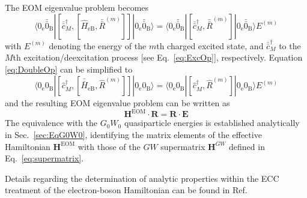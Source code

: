 The EOM eigenvalue problem becomes 
\begin{equation}
	\langle 0_{\mathrm{e}}\bar{\bar{0}}_{\mathrm{B}}| [\bar{\bar{c}}^\dagger_M, [\hat{H}_{\mathrm{eB}}, \bar{\bar{R}}^{(m)}]] |0_{\mathrm{e}}\bar{\bar{0}}_{\mathrm{B}}\rangle 
	= \langle 0_{\mathrm{e}}\bar{\bar{0}}_{\mathrm{B}}| [\bar{\bar{c}}^\dagger_M, \bar{\bar{R}}^{(m)}] |0_{\mathrm{e}}\bar{\bar{0}}_{\mathrm{B}}\rangle E^{(m)}
	\label{eq:DoubleOp}
\end{equation}
with $E^{(m)}$ denoting the energy of the $m$th charged excited state, and $\bar{\bar{c}}^\dagger_M$ to the $M$th excitation/deexcitation process [see Eq.~\eqref{eq:ExcOp}], respectively.
Equation \eqref{eq:DoubleOp} can be simplified to 
\begin{equation}
	\langle 0_{\mathrm{e}}{0}_{\mathrm{B}}| [\hat{c}^\dagger_M, [\bar{\bar{H}}_{\mathrm{eB}}, \hat{R}^{(m)}]] |0_{\mathrm{e}}0_{\mathrm{B}}\rangle 
	= \langle 0_{\mathrm{e}}{0}_{\mathrm{B}}| [\hat{c}^\dagger_M, \hat{R}^{(m)}] |0_{\mathrm{e}}0_{\mathrm{B}}\rangle E^{(m)}
\end{equation}
and the resulting EOM eigenvalue problem can be written as 
\begin{equation} \label{eq:EOMECCeB}
	\mathbf{H}^{\text{EOM}} \cdot \mathbf{R} = \mathbf{R} \cdot \mathbf{E}
\end{equation}
The equivalence with the $G_0W_0$ quasiparticle energies is established analytically in Sec.~\ref{sec:EqG0W0}, identifying the matrix elements of the effective Hamiltonian $\mathbf{H}^{\text{EOM}}$ with those of the $GW$ supermatrix $\mathbf{H}^{GW}$ defined in Eq.~\eqref{eq:supermatrix}.

Details regarding the determination of analytic properties within the ECC treatment of the electron-boson Hamiltonian can be found in Ref.



